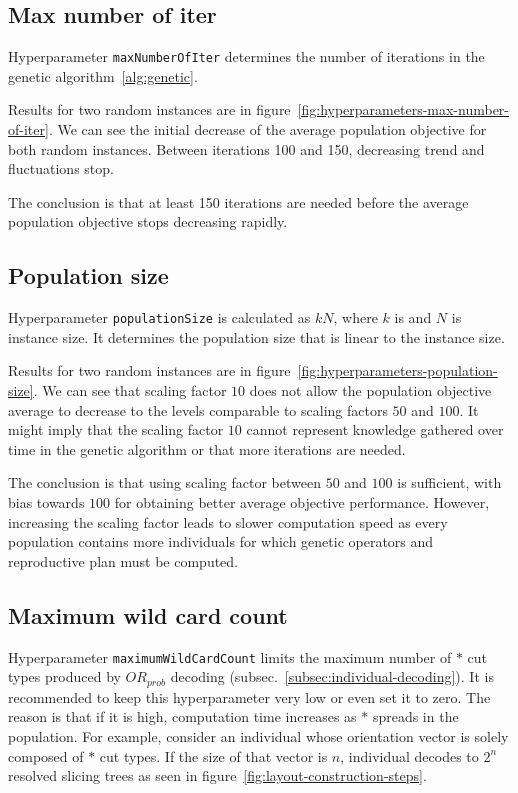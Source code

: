 \subsection{Max number of iter}\label{subsec:max-number-of-iter}
Hyperparameter \verb|maxNumberOfIter| determines the number of iterations in the genetic algorithm~\ref{alg:genetic}.

Results for two random instances are in figure~\ref{fig:hyperparameters-max-number-of-iter}.
We can see the initial decrease of the average population objective for both random instances.
Between iterations 100 and 150, decreasing trend and fluctuations stop.

The conclusion is that at least 150 iterations are needed before the average population objective
stops decreasing rapidly.

\subsection{Population size}\label{subsec:population-size}

Hyperparameter \verb|populationSize| is calculated as $kN$, where $k$ is 
and $N$ is instance size.
It determines the population size that is linear to the instance size.

Results for two random instances are in figure~\ref{fig:hyperparameters-population-size}.
We can see that scaling factor $10$ does not allow
the population objective average to decrease to the levels comparable to scaling factors $50$ and $100$.
It might imply that the scaling factor $10$ cannot represent knowledge gathered over time
in the genetic algorithm or that more iterations are needed.

The conclusion is that using scaling factor between $50$ and $100$ is sufficient, with bias towards $100$
for obtaining better average objective performance.
However, increasing the scaling factor leads to slower computation speed as every population contains
more individuals for which genetic operators and reproductive plan must be computed.

\subsection{Maximum wild card count}\label{subsec:maximum-wild-card-count}
Hyperparameter \verb|maximumWildCardCount| limits the maximum number of $*$ cut types produced by $OR_{prob}$ decoding (subsec.~\ref{subsec:individual-decoding}).
It is recommended to keep this hyperparameter very low or even set it to zero.
The reason is that if it is high, computation time increases as $*$ spreads in the population.
For example, consider an individual whose orientation vector is solely composed of $*$ cut types.
If the size of that vector is $n$, individual decodes to $2^n$ resolved slicing trees as seen in figure~\ref{fig:layout-construction-steps}.



